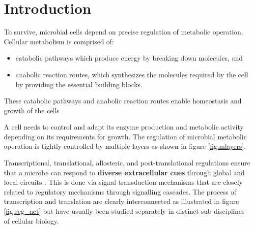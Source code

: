 \documentclass[12pt,chapterheads]{ucsd}
\begin{document}
%







%   
%   
%


\chapter{Introduction}
To survive, microbial cells depend on precise regulation of metabolic operation. Cellular metabolism is comprised of: 
\begin{itemize}
    \item catabolic pathways which produce energy by breaking down molecules, and
    \item anabolic reaction routes, which synthesizes the molecules required by the cell by providing the essential building blocks. 
\end{itemize}
These catabolic pathways and anabolic reaction routes enable homeostasis and growth of the cells \cite{C3MB25489E}

A cell needs to control and adapt its enzyme production and metabolic activity depending on its requirements for growth. The regulation of microbial metabolic operation is tightly controlled by multiple layers \cite{Kotte2010} as shown in figure \ref{fig:mlayers}.

Transcriptional, translational, allosteric, and post-translational regulations ensure that a microbe can respond to \textbf{diverse extracellular cues} through global and local circuits \cite{Chubukov2014}. This is done via signal transduction mechanisms that are closely related to regulatory mechanisms through signalling cascades. The process of transcription and translation are clearly interconnected as illustrated in figure \ref{fig:reg_net} but have usually been studied separately in distinct sub-disciplines
of cellular biology.
\end{document}

